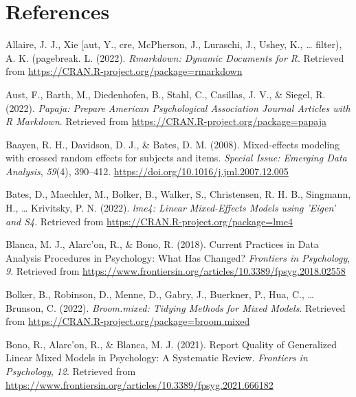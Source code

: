 \documentclass[
  man,floatsintext]{apa7}
\newlength{\cslhangindent}
\newlength{\cslentryspacingunit} %
\newenvironment{CSLReferences}[2] %
 {%
  \setlength{\parindent}{0pt}
  \ifodd #1
  \let\oldpar\par
  \def\par{\hangindent=\cslhangindent\oldpar}
  \fi
  \setlength{\parskip}{#2\cslentryspacingunit}
 }%
 {}
\begin{document}
\newpage

\hypertarget{references}{%
\section{References}\label{references}}

\hypertarget{refs}{}
\begin{CSLReferences}{1}{0}
\leavevmode{}%
Allaire, J. J., Xie {[}aut, Y., cre, McPherson, J., Luraschi, J., Ushey, K., \ldots{} filter), A. K. (pagebreak. L. (2022). \emph{Rmarkdown: {Dynamic} {Documents} for {R}}. Retrieved from \url{https://CRAN.R-project.org/package=rmarkdown}

\leavevmode{}%
Aust, F., Barth, M., Diedenhofen, B., Stahl, C., Casillas, J. V., \& Siegel, R. (2022). \emph{Papaja: {Prepare} {American} {Psychological} {Association} {Journal} {Articles} with {R} {Markdown}}. Retrieved from \url{https://CRAN.R-project.org/package=papaja}

\leavevmode{}%
Baayen, R. H., Davidson, D. J., \& Bates, D. M. (2008). Mixed-effects modeling with crossed random effects for subjects and items. \emph{Special Issue: Emerging Data Analysis}, \emph{59}(4), 390--412. \url{https://doi.org/10.1016/j.jml.2007.12.005}

\leavevmode{}%
Bates, D., Maechler, M., Bolker, B., Walker, S., Christensen, R. H. B., Singmann, H., \ldots{} Krivitsky, P. N. (2022). \emph{lme4: {Linear} {Mixed}-{Effects} {Models} using '{Eigen}' and {S4}}. Retrieved from \url{https://CRAN.R-project.org/package=lme4}

\leavevmode{}%
Blanca, M. J., Alarc'on, R., \& Bono, R. (2018). Current {Practices} in {Data} {Analysis} {Procedures} in {Psychology}: {What} {Has} {Changed}? \emph{Frontiers in Psychology}, \emph{9}. Retrieved from \url{https://www.frontiersin.org/articles/10.3389/fpsyg.2018.02558}

\leavevmode{}%
Bolker, B., Robinson, D., Menne, D., Gabry, J., Buerkner, P., Hua, C., \ldots{} Brunson, C. (2022). \emph{Broom.mixed: {Tidying} {Methods} for {Mixed} {Models}}. Retrieved from \url{https://CRAN.R-project.org/package=broom.mixed}

\leavevmode{}%
Bono, R., Alarc'on, R., \& Blanca, M. J. (2021). Report {Quality} of {Generalized} {Linear} {Mixed} {Models} in {Psychology}: {A} {Systematic} {Review}. \emph{Frontiers in Psychology}, \emph{12}. Retrieved from \url{https://www.frontiersin.org/articles/10.3389/fpsyg.2021.666182}


\end{CSLReferences}
\end{document}
